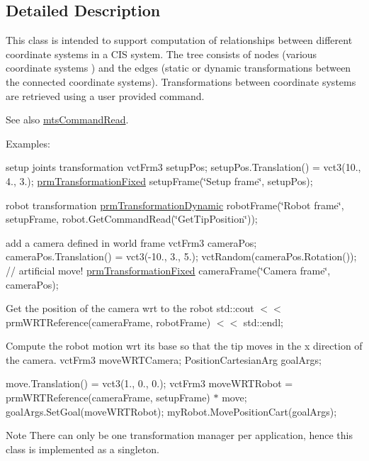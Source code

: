 \subsection{Detailed Description}
This class is intended to support computation of relationships between different coordinate systems in a C\+I\+S system. The tree consists of nodes (various coordinate systems ) and the edges (static or dynamic transformations between the connected coordinate systems). Transformations between coordinate systems are retrieved using a user provided command. \begin{DoxySeeAlso}{See also}
\hyperlink{classmts_command_read}{mts\+Command\+Read}.
\end{DoxySeeAlso}
Examples\+: {\ttfamily }

{\ttfamily setup joints transformation vct\+Frm3 setup\+Pos; setup\+Pos.\+Translation() = vct3(10., 4., 3.); \hyperlink{classprm_transformation_fixed}{prm\+Transformation\+Fixed} setup\+Frame(\char`\"{}\+Setup frame\char`\"{}, setup\+Pos);}

{\ttfamily robot transformation \hyperlink{classprm_transformation_dynamic}{prm\+Transformation\+Dynamic} robot\+Frame(\char`\"{}\+Robot frame\char`\"{}, setup\+Frame, robot.\+Get\+Command\+Read(\char`\"{}\+Get\+Tip\+Position\char`\"{}));}

{\ttfamily add a camera defined in world frame vct\+Frm3 camera\+Pos; camera\+Pos.\+Translation() = vct3(-\/10., 3., 5.); vct\+Random(camera\+Pos.\+Rotation()); // artificial move! \hyperlink{classprm_transformation_fixed}{prm\+Transformation\+Fixed} camera\+Frame(\char`\"{}\+Camera frame\char`\"{}, camera\+Pos);}

{\ttfamily Get the position of the camera wrt to the robot std\+::cout $<$$<$ prm\+W\+R\+T\+Reference(camera\+Frame, robot\+Frame) $<$$<$ std\+::endl;}

{\ttfamily Compute the robot motion wrt its base so that the tip moves in the x direction of the camera. vct\+Frm3 move\+W\+R\+T\+Camera; Position\+Cartesian\+Arg goal\+Args;}

{\ttfamily  move.\+Translation() = vct3(1., 0., 0.); vct\+Frm3 move\+W\+R\+T\+Robot = prm\+W\+R\+T\+Reference(camera\+Frame, setup\+Frame) $\ast$ move; goal\+Args.\+Set\+Goal(move\+W\+R\+T\+Robot); my\+Robot.\+Move\+Position\+Cart(goal\+Args);}

{\ttfamily  }

\begin{DoxyNote}{Note}
There can only be one transformation manager per application, hence this class is implemented as a singleton. 
\end{DoxyNote}


